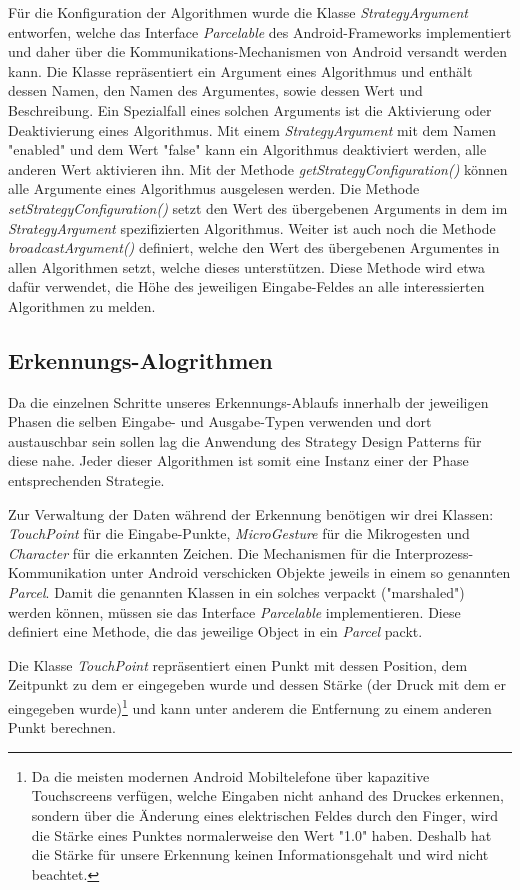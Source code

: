 \label{lbl_be_enable}Für die Konfiguration der Algorithmen wurde die Klasse \emph{StrategyArgument} entworfen, welche das Interface \emph{Parcelable} des Android-Frameworks implementiert und daher über die Kommunikations-Mechanismen von Android versandt werden kann. Die Klasse repräsentiert ein Argument eines Algorithmus und enthält dessen Namen, den Namen des Argumentes, sowie dessen Wert und Beschreibung. Ein Spezialfall eines solchen Arguments ist die Aktivierung oder Deaktivierung eines Algorithmus. Mit einem \emph{StrategyArgument} mit dem Namen "enabled" und dem Wert "false" kann ein Algorithmus deaktiviert werden, alle anderen Wert aktivieren ihn. Mit der Methode \emph{getStrategyConfiguration()} können alle Argumente eines Algorithmus ausgelesen werden. Die Methode \emph{setStrategyConfiguration()} setzt den Wert des übergebenen Arguments in dem im \emph{StrategyArgument} spezifizierten Algorithmus. Weiter ist auch noch die Methode \emph{broadcastArgument()} definiert, welche den Wert des übergebenen Argumentes in allen Algorithmen setzt, welche dieses unterstützen. Diese Methode wird etwa dafür verwendet, die Höhe des jeweiligen Eingabe-Feldes an alle interessierten Algorithmen zu melden.

\subsection{Erkennungs-Alogrithmen}

Da die einzelnen Schritte unseres Erkennungs-Ablaufs innerhalb der jeweiligen Phasen die selben Eingabe- und Ausgabe-Typen verwenden und dort austauschbar sein sollen lag die Anwendung des Strategy Design Patterns\cite[S.315-323]{designpatterns} für diese nahe. Jeder dieser Algorithmen ist somit eine Instanz einer der Phase entsprechenden Strategie.

Zur Verwaltung der Daten während der Erkennung benötigen wir drei Klassen: \emph{TouchPoint} für die Eingabe-Punkte, \emph{MicroGesture} für die Mikrogesten und \emph{Character} für die erkannten Zeichen. Die Mechanismen für die Interprozess-Kommunikation unter Android verschicken Objekte jeweils in einem so genannten \emph{Parcel}. Damit die genannten Klassen in ein solches verpackt ("marshaled") werden können, müssen sie das Interface \emph{Parcelable} implementieren. Diese definiert eine Methode, die das jeweilige Object in ein \emph{Parcel} packt.

Die Klasse \emph{TouchPoint} repräsentiert einen Punkt mit dessen Position, dem Zeitpunkt zu dem er eingegeben wurde und dessen Stärke (der Druck mit dem er eingegeben wurde)\footnote{Da die meisten modernen Android Mobiltelefone über kapazitive Touchscreens verfügen, welche Eingaben nicht anhand des Druckes erkennen, sondern über die Änderung eines elektrischen Feldes durch den Finger, wird die Stärke eines Punktes normalerweise den Wert "1.0" haben. Deshalb hat die Stärke für unsere Erkennung keinen Informationsgehalt und wird nicht beachtet.} und kann unter anderem die Entfernung zu einem anderen Punkt berechnen.

